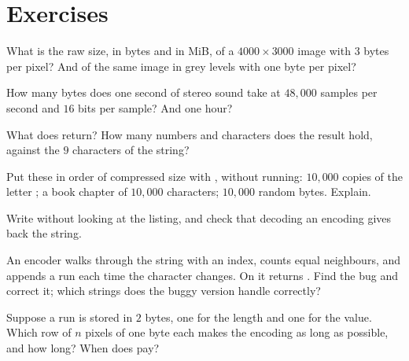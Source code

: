 \section{Exercises}\label{sec:g10:images-sound-compression:exercises}

\begin{exercise}[$\star$]\label{exo:g10:images-sound-compression:1}
What is the raw size, in bytes and in MiB, of a $4000 \times 3000$ image with $3$ bytes per pixel? And of the same
image in grey levels with one byte per pixel?
\end{exercise}

\begin{exercise}[$\star$]\label{exo:g10:images-sound-compression:2}
How many bytes does one second of stereo sound take at $48{,}000$ samples per second and $16$ bits per sample? And one
hour?
\end{exercise}

\begin{exercise}[$\star$]\label{exo:g10:images-sound-compression:3}
What does  return? How many numbers and characters does the result hold, against the
$9$ characters of the string?
\end{exercise}

\begin{exercise}[$\star$]\label{exo:g10:images-sound-compression:4}
Put these in order of compressed size with , without running: $10{,}000$ copies of the letter ; a
book chapter of $10{,}000$ characters; $10{,}000$ random bytes. Explain.
\end{exercise}

\begin{exercise}[$\star$]\label{exo:g10:images-sound-compression:5}
Write  without looking at the listing, and check that decoding an encoding gives back the
string.
\end{exercise}

\begin{exercise}[$\star\star$]\label{exo:g10:images-sound-compression:6}
An encoder walks through the string with an index, counts equal neighbours, and appends a run each time the character
changes. On  it returns \code{[(2, "W")]}. Find the bug and correct it; which strings does the buggy
version handle correctly?
\end{exercise}

\begin{exercise}[$\star\star$]\label{exo:g10:images-sound-compression:7}
Suppose a run is stored in $2$ bytes, one for the length and one for the value. Which row of $n$ pixels of one byte
each makes the encoding as long as possible, and how long? When does  pay?
\end{exercise}

